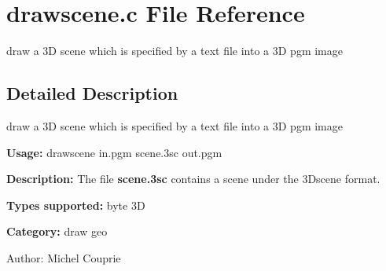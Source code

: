 \section{drawscene.c File Reference}
\label{drawscene_8c}
draw a 3D scene which is specified by a text file into a 3D pgm image 



\subsection{Detailed Description}
draw a 3D scene which is specified by a text file into a 3D pgm image 

{\bf Usage:} drawscene in.pgm scene.3sc out.pgm

{\bf Description:} The file {\bf scene.3sc} contains a scene under the 3Dscene format.

{\bf Types supported:} byte 3D

{\bf Category:} draw geo

\begin{Desc}
\item[Author:]Michel Couprie \end{Desc}
